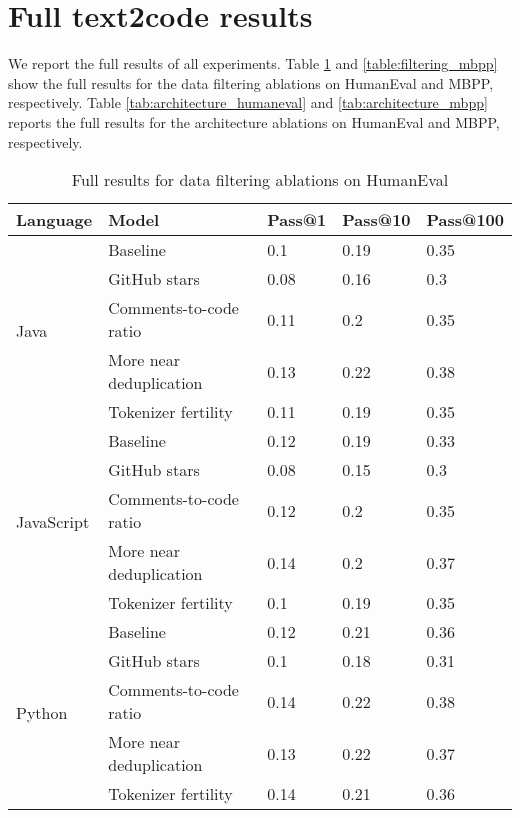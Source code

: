 \documentclass[10pt]{article} \usepackage{iclr2023_conference,times}
\begin{document}
\section{Full text2code results}\label{sec:text2code_full}
We report the full results of all experiments. Table \ref{table:filtering_humaneval} and \ref{table:filtering_mbpp} show the full results for the data filtering ablations on HumanEval and MBPP, respectively. Table \ref{tab:architecture_humaneval} and \ref{tab:architecture_mbpp} reports the full results for the architecture ablations on HumanEval and MBPP, respectively.  
\begin{table}[htbp]
\centering
\begin{tabular}{lllll}
\toprule
Language & Model & Pass@1 & Pass@10 & Pass@100\\
\midrule
\multirow{5}{*}{Java} & Baseline & 0.1 & 0.19 & 0.35\\
& GitHub stars & 0.08 & 0.16 & 0.3\\
& Comments-to-code ratio & 0.11 & 0.2 & 0.35\\
& More near deduplication & 0.13 & 0.22 & 0.38\\
& Tokenizer fertility & 0.11 & 0.19 & 0.35\\
\midrule
\multirow{5}{*}{JavaScript} & Baseline  & 0.12 & 0.19 & 0.33\\
& GitHub stars & 0.08 & 0.15 & 0.3\\
& Comments-to-code ratio & 0.12 & 0.2 & 0.35\\
& More near deduplication & 0.14 & 0.2 & 0.37\\
& Tokenizer fertility   & 0.1 & 0.19 & 0.35\\
\midrule
\multirow{5}{*}{Python} & Baseline & 0.12 & 0.21 & 0.36\\
& GitHub stars & 0.1 & 0.18 & 0.31\\
& Comments-to-code ratio & 0.14 & 0.22 & 0.38\\
& More near deduplication & 0.13 & 0.22 & 0.37\\
& Tokenizer fertility & 0.14 & 0.21 & 0.36\\
\bottomrule
\end{tabular}
\caption{Full results for data filtering ablations on HumanEval}
\label{table:filtering_humaneval}
\end{table}

\newpage
\end{document}
